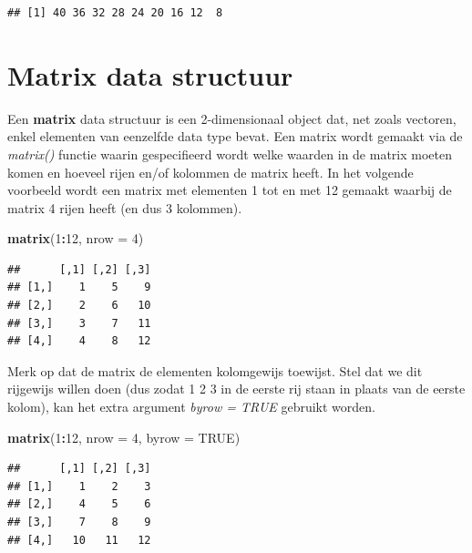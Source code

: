 \documentclass[
]{book}
\newenvironment{Shaded}{\begin{snugshade}}{\end{snugshade}}
\newcommand{\AttributeTok}[1]{\textcolor[rgb]{0.13,0.29,0.53}{#1}}
\newcommand{\ConstantTok}[1]{\textcolor[rgb]{0.56,0.35,0.01}{#1}}
\newcommand{\DecValTok}[1]{\textcolor[rgb]{0.00,0.00,0.81}{#1}}
\newcommand{\FunctionTok}[1]{\textcolor[rgb]{0.13,0.29,0.53}{\textbf{#1}}}
\newcommand{\NormalTok}[1]{#1}
\newcommand{\SpecialCharTok}[1]{\textcolor[rgb]{0.81,0.36,0.00}{\textbf{#1}}}
\begin{document}
\begin{verbatim}
## [1] 40 36 32 28 24 20 16 12  8
\end{verbatim}

\hypertarget{matrix-data-structuur}{%
\section{Matrix data structuur}\label{matrix-data-structuur}}

Een \textbf{matrix} data structuur is een 2-dimensionaal object dat, net zoals vectoren, enkel elementen van eenzelfde data type bevat. Een matrix wordt gemaakt via de \emph{matrix()} functie waarin gespecifieerd wordt welke waarden in de matrix moeten komen en hoeveel rijen en/of kolommen de matrix heeft.
In het volgende voorbeeld wordt een matrix met elementen 1 tot en met 12 gemaakt waarbij de matrix 4 rijen heeft (en dus 3 kolommen).

\begin{Shaded}
\begin{Highlighting}[]
\FunctionTok{matrix}\NormalTok{(}\DecValTok{1}\SpecialCharTok{:}\DecValTok{12}\NormalTok{, }\AttributeTok{nrow =} \DecValTok{4}\NormalTok{)}
\end{Highlighting}
\end{Shaded}

\begin{verbatim}
##      [,1] [,2] [,3]
## [1,]    1    5    9
## [2,]    2    6   10
## [3,]    3    7   11
## [4,]    4    8   12
\end{verbatim}

Merk op dat de matrix de elementen kolomgewijs toewijst. Stel dat we dit rijgewijs willen doen (dus zodat 1 2 3 in de eerste rij staan in plaats van de eerste kolom), kan het extra argument \emph{byrow = TRUE} gebruikt worden.

\begin{Shaded}
\begin{Highlighting}[]
\FunctionTok{matrix}\NormalTok{(}\DecValTok{1}\SpecialCharTok{:}\DecValTok{12}\NormalTok{, }\AttributeTok{nrow =} \DecValTok{4}\NormalTok{, }\AttributeTok{byrow =} \ConstantTok{TRUE}\NormalTok{)}
\end{Highlighting}
\end{Shaded}

\begin{verbatim}
##      [,1] [,2] [,3]
## [1,]    1    2    3
## [2,]    4    5    6
## [3,]    7    8    9
## [4,]   10   11   12
\end{verbatim}
\end{document}
